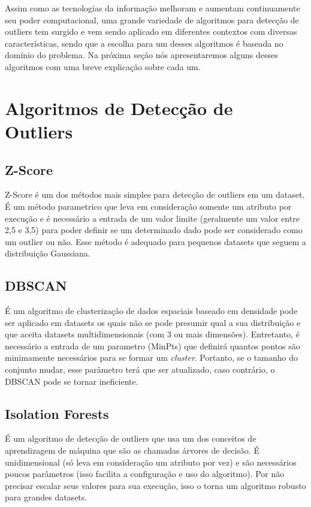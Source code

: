 Assim como as tecnologias da informação melhoram e aumentam continuamente seu poder computacional, uma grande variedade de algoritmos para detecção de outliers tem surgido e vem sendo aplicado em diferentes contextos com diversas características, sendo que a escolha para um desses algoritmos é baseada no domínio do problema. Na próxima seção nós apresentaremos alguns desses algoritmos com uma breve explicação sobre cada um.

\section{Algoritmos de Detecção de Outliers}

\subsection{Z-Score}

Z-Score \cite{doi:10.1111/j.1540-6261.1968.tb00843.x} é um dos métodos mais simples para detecção de outliers em um dataset. É um método parametrico que leva em consideração somente um atributo por execução e é necessário a entrada de um valor limite (geralmente um valor entre 2,5 e 3,5) para poder definir se um determinado dado pode ser considerado como um outlier ou não. Esse método é adequado para pequenos datasets que seguem a distribuição Gaussiana.

\subsection{DBSCAN}

É um algoritmo de clusterização de dados espaciais baseado em densidade \cite{Ester:1996:DAD:3001460.3001507} pode ser aplicado em datasets os quais não se pode presumir qual a sua distribuição e que aceita datasets multidimensionais (com 3 ou mais dimensões). Entretanto, é necessário a entrada de um parametro (MinPts) que definirá quantos pontos são minimamente necessários para se formar um \textit{cluster}. Portanto, se o tamanho do conjunto mudar, esse parâmetro terá que ser atualizado, caso contrário, o DBSCAN pode se tornar ineficiente.

\subsection{Isolation Forests}

É um algoritmo de detecção de outliers \cite{IsolationForests} que usa um dos conceitos de aprendizagem de máquina que são as chamadas árvores de decisão. É unidimensional (só leva em consideração um atributo por vez) e são necessários poucos parâmetros (isso facilita a configuração e uso do algoritmo). Por não precisar escalar seus valores para sua execução, isso o torna um algoritmo robusto para grandes datasets.



